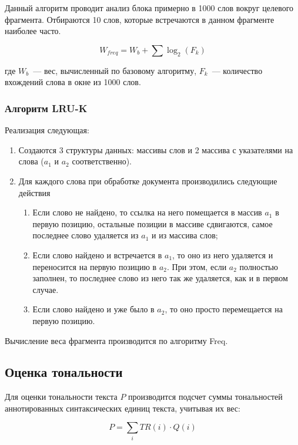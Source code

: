 \documentclass[a4paper,14pt,russian]{extreport}
\begin{document}
Данный алгоритм проводит анализ блока примерно в 1000 слов вокруг целевого фрагмента. Отбираются 10 слов, которые встречаются в данном фрагменте наиболее часто.

\begin{equation}
	W_{freq}=W_b+\sum\log_2\left(F_k\right)
\end{equation}

где $W_b$~--- вес, вычисленный по базовому алгоритму, $F_k$~--- количество вхождений слова в окне из 1000 слов.

\subsubsection{Алгоритм LRU-K}

Реализация следующая:

\begin{enumerate}
\item Создаются 3 структуры данных: массивы слов и 2 массива с указателями на слова ($a_1$ и $a_2$ соответственно).
\item Для каждого слова при обработке документа производились следующие действия
\begin{enumerate}
\item Если слово не найдено, то ссылка на него помещается в массив $a_1$ в первую позицию, остальные позиции в массиве сдвигаются, самое последнее слово удаляется из $a_1$ и из массива слов;
\item Если слово найдено и встречается в $a_1$, то оно из него удаляется и переносится на первую позицию в $a_2$. При этом, если $a_2$ полностью заполнен, то последнее слово из него так же удаляется, как и в первом случае.
\item Если слово найдено и уже было в $a_2$, то оно просто перемещается на первую позицию.
\end{enumerate}
\end{enumerate}

Вычисление веса фрагмента производится по алгоритму Freq.

\subsection{Оценка тональности}

Для оценки тональности текста $P$ производится подсчет суммы тональностей аннотированных синтаксических единиц текста, учитывая их вес:

\begin{equation}
P=\sum\limits_i TR\left(i\right)\cdot Q\left(i\right)
\end{equation}
\end{document}
